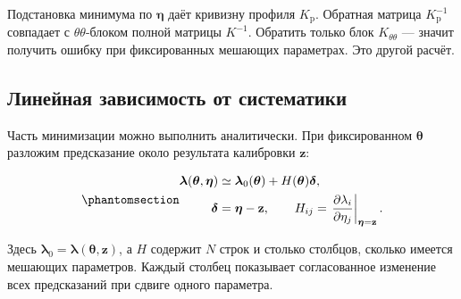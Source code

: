 \documentclass[
  russian,
  11pt,
  a4paper,
  open=any]{scrbook}
\begin{document}
Подстановка минимума по \(\boldsymbol\eta\) даёт кривизну профиля
\(K_{\mathrm p}\). Обратная матрица \(K_{\mathrm p}^{-1}\) совпадает с
\(\theta\theta\)-блоком полной матрицы \(K^{-1}\). Обратить только блок
\(K_{\theta\theta}\) --- значит получить ошибку при фиксированных
мешающих параметрах. Это другой расчёт.

\subsection{Линейная зависимость от
систематики}\label{ux43bux438ux43dux435ux439ux43dux430ux44f-ux437ux430ux432ux438ux441ux438ux43cux43eux441ux442ux44c-ux43eux442-ux441ux438ux441ux442ux435ux43cux430ux442ux438ux43aux438}

Часть минимизации можно выполнить аналитически. При фиксированном
\(\boldsymbol\theta\) разложим предсказание около результата калибровки
\(\mathbf z\):

\begin{equation}\protect\phantomsection\label{eq-ch12-linear-systematics}{
\begin{aligned}
\boldsymbol\lambda(\boldsymbol\theta,\boldsymbol\eta)
&\simeq\boldsymbol\lambda_0(\boldsymbol\theta)+H(\boldsymbol\theta)\boldsymbol\delta,\\
\boldsymbol\delta&=\boldsymbol\eta-\mathbf z,
\qquad
H_{ij}=\left.\frac{\partial\lambda_i}{\partial\eta_j}\right|_{\boldsymbol\eta=\mathbf z}.
\end{aligned}
}\end{equation}

Здесь
\(\boldsymbol\lambda_0=\boldsymbol\lambda(\boldsymbol\theta,\mathbf z)\),
а \(H\) содержит \(N\) строк и столько столбцов, сколько имеется
мешающих параметров. Каждый столбец показывает согласованное изменение
всех предсказаний при сдвиге одного параметра.
\end{document}
